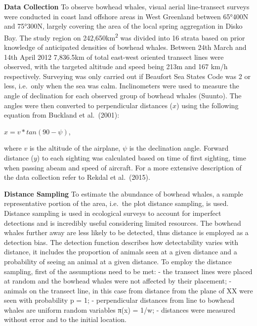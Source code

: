 \documentclass[
  12pt,
]{article}
\begin{document}
\textbf{Data Collection} To observe bowhead whales, visual aerial
line-transect surveys were conducted in coast land offshore areas in
West Greenland between 65°400N and 75°300N, largely covering the area of
the local spring aggregation in Disko Bay. The study region on
242,650km\textsuperscript{2} was divided into 16 strata based on prior
knowledge of anticipated densities of bowhead whales. Between 24th March
and 14th April 2012 7,836.5km of total east-west oriented transect lines
were observed, with the targeted altitude and speed being 213m and 167
km/h respectively. Surveying was only carried out if Beaufort Sea States
Code was 2 or less, i.e.~only when the sea was calm. Inclinometers were
used to measure the angle of declination for each observed group of
bowhead whales (Suunto). The angles were then converted to perpendicular
distances (\(x\)) using the following equation from Buckland et
al.~(2001):

\(x = v * tan(90 - \psi )\),

where \(v\) is the altitude of the airplane, \(\psi\) is the declination
angle. Forward distance (\(y\)) to each sighting was calculated based on
time of first sighting, time when passing abeam and speed of aircraft.
For a more extensive description of the data collection refer to Rekdal
et al.~(2015).

\textbf{Distance Sampling} To estimate the abundance of bowhead whales,
a sample representative portion of the area, i.e.~the plot distance
sampling, is used. Distance sampling is used in ecological surveys to
account for imperfect detections and is incredibly useful considering
limited resources. The bowhead whales further away are less likely to be
detected, thus distance is employed as a detection bias. The detection
function describes how detectability varies with distance, it includes
the proportion of animals seen at a given distance and a probability of
seeing an animal at a given distance. To employ the distance sampling,
first of the assumptions need to be met: - the transect lines were
placed at random and the bowhead whales were not affected by their
placement; - animals on the transect line, in this case from distance
from the plane of XX were seen with probability p = 1; - perpendicular
distances from line to bowhead whales are uniform random variables π(x)
= 1/w; - distances were measured without error and to the initial
location.
\end{document}
